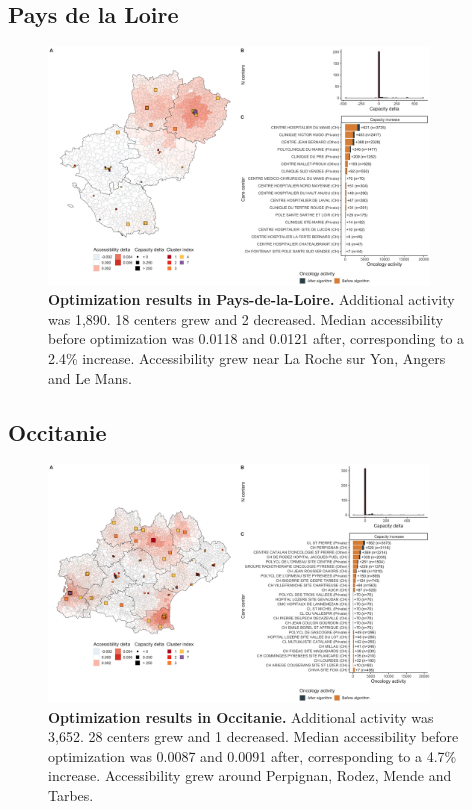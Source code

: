 \subsection*{Pays de la Loire}

\begin{figure}[H]
    \includegraphics[width=0.9\textwidth]{images/camion/optim_region/optim_Pays-de-la-Loire.png}
    \centering
    \caption{ \textbf{Optimization results in Pays-de-la-Loire.} Additional
        activity was 1,890. 18 centers grew and 2 decreased. Median
        accessibility before optimization was 0.0118 and 0.0121 after,
        corresponding to a 2.4\% increase. Accessibility grew near La Roche sur
        Yon, Angers and Le Mans. }
\end{figure}

\subsection*{Occitanie}

\begin{figure}[H]
    \includegraphics[width=0.9\textwidth]{images/camion/optim_region/optim_Occitanie.png}
    \centering
    \caption{ \textbf{Optimization results in Occitanie.} Additional activity
        was 3,652. 28 centers grew and 1 decreased. Median accessibility before
        optimization was 0.0087 and 0.0091 after, corresponding to a 4.7\%
        increase. Accessibility grew around Perpignan, Rodez, Mende and Tarbes.
    }
\end{figure}

